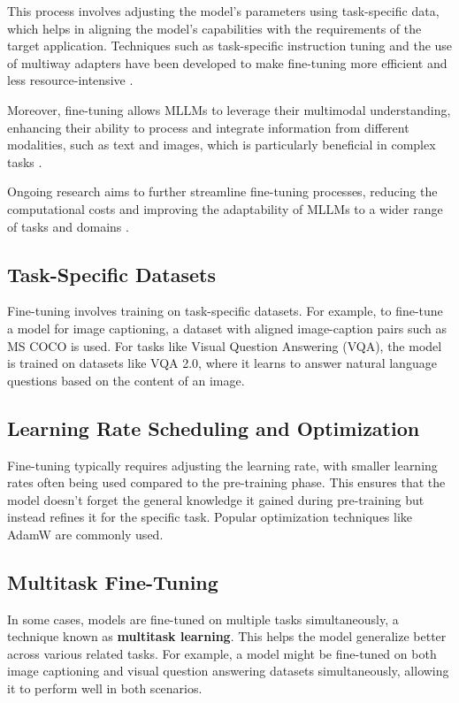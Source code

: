 This process involves adjusting the model's parameters using task-specific data, which helps in aligning the model's capabilities with the requirements of the target application. Techniques such as task-specific instruction tuning and the use of multiway adapters have been developed to make fine-tuning more efficient and less resource-intensive \cite{EfficientMLLMs2024}. 

Moreover, fine-tuning allows MLLMs to leverage their multimodal understanding, enhancing their ability to process and integrate information from different modalities, such as text and images, which is particularly beneficial in complex tasks \cite{MultiwayAdapter2024}.

Ongoing research aims to further streamline fine-tuning processes, reducing the computational costs and improving the adaptability of MLLMs to a wider range of tasks and domains \cite{RobustInstructionTuning2024}.



\subsection{Task-Specific Datasets}

Fine-tuning involves training on task-specific datasets. For example, to fine-tune a model for image captioning, a dataset with aligned image-caption pairs such as MS COCO is used. For tasks like Visual Question Answering (VQA), the model is trained on datasets like VQA 2.0, where it learns to answer natural language questions based on the content of an image.

\subsection{Learning Rate Scheduling and Optimization}

Fine-tuning typically requires adjusting the learning rate, with smaller learning rates often being used compared to the pre-training phase. This ensures that the model doesn’t forget the general knowledge it gained during pre-training but instead refines it for the specific task. Popular optimization techniques like AdamW are commonly used.

\subsection{Multitask Fine-Tuning}

In some cases, models are fine-tuned on multiple tasks simultaneously, a technique known as \textbf{multitask learning}. This helps the model generalize better across various related tasks. For example, a model might be fine-tuned on both image captioning and visual question answering datasets simultaneously, allowing it to perform well in both scenarios.


